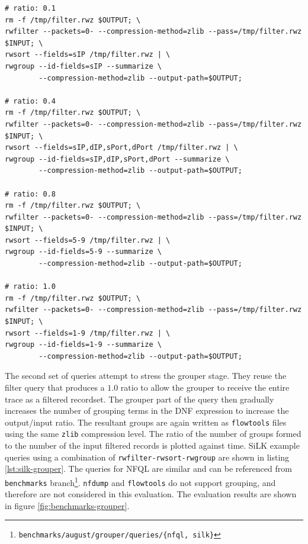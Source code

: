 \begin{lstlisting}
# ratio: 0.1
rm -f /tmp/filter.rwz $OUTPUT; \
rwfilter --packets=0- --compression-method=zlib --pass=/tmp/filter.rwz $INPUT; \
rwsort --fields=sIP /tmp/filter.rwz | \
rwgroup --id-fields=sIP --summarize \
        --compression-method=zlib --output-path=$OUTPUT;

# ratio: 0.4
rm -f /tmp/filter.rwz $OUTPUT; \
rwfilter --packets=0- --compression-method=zlib --pass=/tmp/filter.rwz $INPUT; \
rwsort --fields=sIP,dIP,sPort,dPort /tmp/filter.rwz | \
rwgroup --id-fields=sIP,dIP,sPort,dPort --summarize \
        --compression-method=zlib --output-path=$OUTPUT;

# ratio: 0.8
rm -f /tmp/filter.rwz $OUTPUT; \
rwfilter --packets=0- --compression-method=zlib --pass=/tmp/filter.rwz $INPUT; \
rwsort --fields=5-9 /tmp/filter.rwz | \
rwgroup --id-fields=5-9 --summarize \
        --compression-method=zlib --output-path=$OUTPUT;

# ratio: 1.0
rm -f /tmp/filter.rwz $OUTPUT; \
rwfilter --packets=0- --compression-method=zlib --pass=/tmp/filter.rwz $INPUT; \
rwsort --fields=1-9 /tmp/filter.rwz | \
rwgroup --id-fields=1-9 --summarize \
        --compression-method=zlib --output-path=$OUTPUT;
\end{lstlisting}

The second set of queries attempt to stress the grouper stage. They reuse the
filter query that produces a $1.0$ ratio to allow the grouper to receive the
entire trace as a filtered recordset. The grouper part of the query then
gradually increases the number of grouping terms in the \ac{DNF} expression to
increase the output/input ratio. The resultant groups \marginpar{stressing the
grouper} are again written as \texttt{flowtools} files using the same
\texttt{zlib} compression level. The ratio of the number of groups formed to
the number of the input filtered records is plotted against time. SiLK example
queries using a combination of \texttt{rwfilter-rwsort-rwgroup} are shown in
listing \ref{lst:silk-grouper}.  The queries for \ac{NFQL} are similar and can
be referenced from \texttt{benchmarks}
branch\footnote{\texttt{benchmarks/august/grouper/queries/\{nfql, silk\}}}.
\texttt{nfdump} and \texttt{flowtools} do not support grouping, and therefore
are not considered in this evaluation. The evaluation results are shown in
figure \ref{fig:benchmarks-grouper}.

